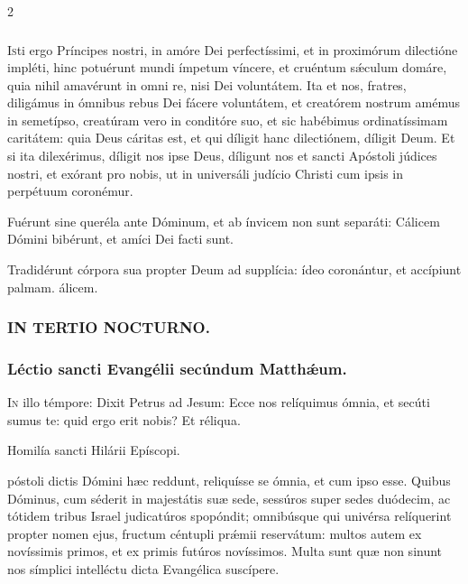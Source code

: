 \documentclass[9pt,twoside]{extarticle}
\begin{document}
\begin{multicols}{2}
\subsubsection*{\center {}}
\lettrine{I}sti ergo Príncipes nostri, in amóre Dei perfectíssimi, et in proximórum dilectióne impléti, hinc potuérunt mundi ímpetum víncere, et cruéntum sǽculum domáre, quia nihil amavérunt in omni re, nisi Dei voluntátem. Ita et nos, fratres, diligámus in ómnibus rebus Dei fácere voluntátem, et creatórem nostrum amémus in semetípso, creatúram vero in conditóre suo, et sic habébimus ordinatíssimam caritátem: quia Deus cáritas est, et qui díligit hanc dilectiónem, díligit Deum. Et si ita dilexérimus, díligit nos ipse Deus, díligunt nos et sancti Apóstoli júdices nostri, et exórant pro nobis, ut in universáli judício Christi cum ipsis in perpétuum coronémur.

\begin{tightlist}{}
\item {} Fuérunt sine queréla ante Dóminum, et ab ínvicem non sunt separáti: \textred{*} Cálicem Dómini bibérunt, et amíci Dei facti sunt.
\item {} Tradidérunt córpora sua propter Deum ad supplícia: ídeo coronántur, et accípiunt palmam. álicem.
\end{tightlist}

\subsubsection*{\center \textsc{IN TERTIO NOCTURNO.}}
\subsubsection*{\center Léctio sancti Evangélii secúndum Matthǽum.}
\begin{center}\end{center}
\lettrine{I}n illo témpore: Dixit Petrus ad Jesum: Ecce nos relíquimus ómnia, et secúti sumus te: quid ergo erit nobis? Et réliqua.

\begin{center}Homilía sancti Hilárii Epíscopi.\\
\end{center}
póstoli dictis Dómini hæc reddunt, reliquísse se ómnia, et cum ipso esse. Quibus Dóminus, cum séderit in majestátis suæ sede, sessúros super sedes duódecim, ac tótidem tribus Israel judicatúros spopóndit; omnibúsque qui univérsa relíquerint propter nomen ejus, fructum céntupli prǽmii reservátum: multos autem ex novíssimis primos, et ex primis futúros novíssimos. Multa sunt quæ non sinunt nos símplici intelléctu dicta Evangélica suscípere.


\end{multicols}
\end{document}
